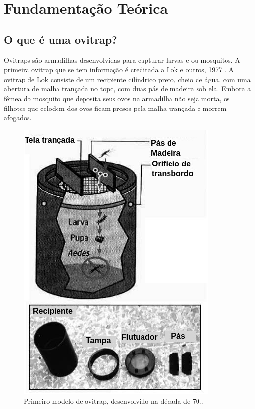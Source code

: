 \documentclass[
	12pt,				%
	openright,			%
	oneside,			%
	a4paper,			%
	chapter=TITLE,		%
	english,			%
	brazil				%
	]{abntex2}
\begin{document}
\chapter{Fundamentação Teórica}

\section{O que é uma ovitrap?}

Ovitraps são armadilhas desenvolvidas para capturar larvas e ou mosquitos. A primeira ovitrap que se tem informação é creditada a 
Lok e outros, 1977 \cite{LOK1977}. A ovitrap de Lok consiste de um recipiente cilíndrico preto, cheio de água,
com uma abertura de malha trançada no topo, com duas pás de madeira sob ela. Embora a
fêmea do mosquito que deposita seus ovos na armadilha não seja morta, os filhotes que
eclodem dos ovos ficam presos pela malha trançada e morrem afogados.

\begin{figure}[H]
\centering
\includegraphics[scale=0.6]{imagens/ovitrapLoki.jpeg}
\caption{Primeiro modelo de ovitrap, desenvolvido na década de 70..}
    \label{fig:OvitrapLoki}
\end{figure}
\end{document}
